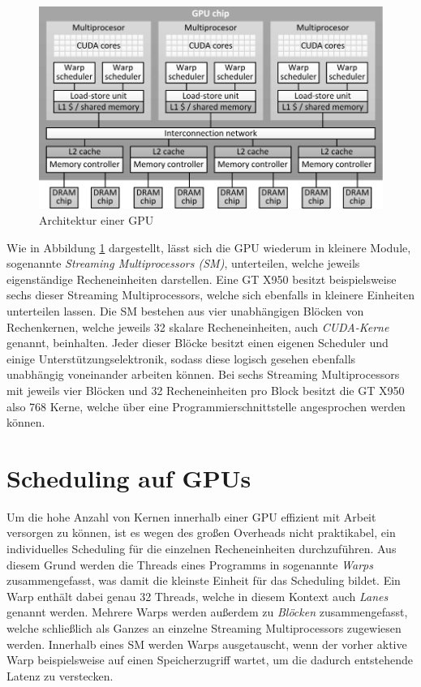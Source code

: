 \begin{figure}[ht]
	\includegraphics[]{bilder/gpu_architecture.pdf}
	\caption{Architektur einer GPU \cite{Volkov2016}}
	\label{gpu_architecture}
\end{figure}

Wie in Abbildung \ref{gpu_architecture} dargestellt, lässt sich die GPU wiederum in kleinere Module, sogenannte \emph{Streaming Multiprocessors (SM)}, unterteilen, welche jeweils eigenständige Recheneinheiten darstellen.
Eine GT X950 besitzt beispielsweise sechs dieser Streaming Multiprocessors, welche sich ebenfalls in kleinere Einheiten unterteilen lassen.
Die SM bestehen aus vier unabhängigen Blöcken von Rechenkernen, welche jeweils 32 skalare Recheneinheiten, auch \emph{CUDA-Kerne} genannt, beinhalten.
Jeder dieser Blöcke besitzt einen eigenen Scheduler und einige Unterstützungselektronik, sodass diese logisch gesehen ebenfalls unabhängig voneinander arbeiten können. \cite{Nvidia2014}
Bei sechs Streaming Multiprocessors mit jeweils vier Blöcken und 32 Recheneinheiten pro Block besitzt die GT X950 also 768 Kerne, welche über eine Programmierschnittstelle angesprochen werden können.

\section{Scheduling auf GPUs}
\label{sec:cuda_scheduling}

Um die hohe Anzahl von Kernen innerhalb einer GPU effizient mit Arbeit versorgen zu können, ist es wegen des großen Overheads nicht praktikabel, ein individuelles Scheduling für die einzelnen Recheneinheiten durchzuführen.
Aus diesem Grund werden die Threads eines Programms in sogenannte \emph{Warps} zusammengefasst, was damit die kleinste Einheit für das Scheduling bildet.
Ein Warp enthält dabei genau 32 Threads, welche in diesem Kontext auch \emph{Lanes} genannt werden.
Mehrere Warps werden außerdem zu \emph{Blöcken} zusammengefasst, welche schließlich als Ganzes an einzelne Streaming Multiprocessors zugewiesen werden.
Innerhalb eines SM werden Warps ausgetauscht, wenn der vorher aktive Warp beispielsweise auf einen Speicherzugriff wartet, um die dadurch entstehende Latenz zu verstecken.

